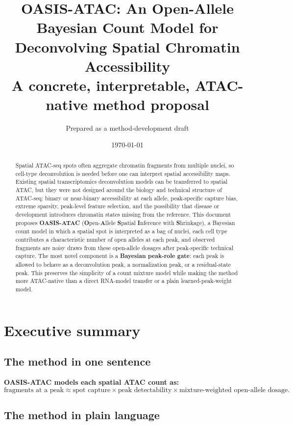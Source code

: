 \documentclass[11pt]{article}
\title{\vspace{-1.0cm}\textbf{OASIS-ATAC: An Open-Allele Bayesian Count Model for Deconvolving Spatial Chromatin Accessibility}\\[0.6em]
\large A concrete, interpretable, ATAC-native method proposal}
\author{Prepared as a method-development draft}
\date{\today}
\begin{document}
\maketitle

\begin{abstract}
Spatial ATAC-seq spots often aggregate chromatin fragments from multiple nuclei, so cell-type deconvolution is needed before one can interpret spatial accessibility maps. Existing spatial transcriptomics deconvolution models can be transferred to spatial ATAC, but they were not designed around the biology and technical structure of ATAC-seq: binary or near-binary accessibility at each allele, peak-specific capture bias, extreme sparsity, peak-level feature selection, and the possibility that disease or development introduces chromatin states missing from the reference. This document proposes \textbf{OASIS-ATAC} (\textbf{O}pen-\textbf{A}llele \textbf{S}patial \textbf{I}nference with \textbf{S}hrinkage), a Bayesian count model in which a spatial spot is interpreted as a bag of nuclei, each cell type contributes a characteristic number of open alleles at each peak, and observed fragments are noisy draws from these open-allele dosages after peak-specific technical capture. The most novel component is a \textbf{Bayesian peak-role gate}: each peak is allowed to behave as a deconvolution peak, a normalization peak, or a residual-state peak. This preserves the simplicity of a count mixture model while making the method more ATAC-native than a direct RNA-model transfer or a plain learned-peak-weight model.
\end{abstract}

\tableofcontents
\newpage

\section{Executive summary}

\subsection{The method in one sentence}

\textbf{OASIS-ATAC models each spatial ATAC count as:}
\[
\text{fragments at a peak}
\approx
\text{spot capture}
\times
\text{peak detectability}
\times
\text{mixture-weighted open-allele dosage}.
\]

\subsection{The method in plain language}
\end{document}
